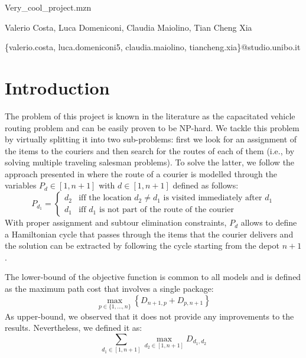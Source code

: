 \documentclass{article}
\begin{document}
    \begin{titlepage}
        \begin{center}
            {\LARGE Very\_cool\_project.mzn}
            \vspace*{1em}
            
            Valerio Costa, Luca Domeniconi, Claudia Maiolino, Tian Cheng Xia

            \centerline{\{valerio.costa, luca.domeniconi5, claudia.maiolino, tiancheng.xia\}@studio.unibo.it}
        \end{center}
    \end{titlepage}


    \section{Introduction} \label{sec:intro}
    The problem of this project is known in the literature as the capacitated vehicle routing problem and can be easily proven to be NP-hard. We tackle this problem by virtually splitting it into two sub-problems: first we look for an assignment of the items to the couriers and then search for the routes of each of them (i.e., by solving multiple traveling salesman problems). To solve the latter, we follow the approach presented in \cite{vrp} where the route of a courier is modelled through the variables $P_d \in [1, n+1]$ with $d \in [1, n+1]$ defined as follows:
    \begin{equation}
        \label{eq:path_def}
        P_{d_1} = \begin{cases}
            d_2 & \text{iff the location $d_2 \neq d_1$ is visited immediately after $d_1$}\\
            d_1 & \text{iff $d_1$ is not part of the route of the courier}
        \end{cases}
    \end{equation} 
    With proper assignment and subtour elimination constraints, $P_d$ allows to define a Hamiltonian cycle that passes through the items that the courier delivers and the solution can be extracted by following the cycle starting from the depot $n+1$.

    The lower-bound of the objective function is common to all models and is defined as the maximum path cost that involves a single package:
    \begin{equation}
        \max_{p \in \{ 1, \dots, n \}} \left\{ D_{n+1, p} + D_{p, n+1} \right\}
    \end{equation}
    As upper-bound, we observed that it does not provide any improvements to the results. Nevertheless, we defined it as:
    \begin{equation}
        \sum_{d_1 \in [1, n+1]} \max_{d_2 \in [1, n+1]} D_{d_1, d_2}
    \end{equation}
\end{document}
